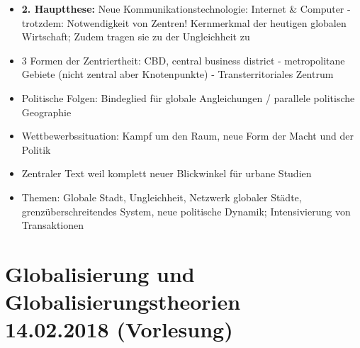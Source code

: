 \documentclass[emulatestandardclasses]{scrartcl}
\begin{document}
\begin{itemize}
  \item \textbf{2. Hauptthese:} Neue Kommunikationstechnologie: Internet \& Computer - trotzdem: Notwendigkeit von Zentren! Kernmerkmal der heutigen globalen Wirtschaft; Zudem tragen sie zu der Ungleichheit zu
  \item 3 Formen der Zentriertheit: CBD, central business district - metropolitane Gebiete (nicht zentral aber Knotenpunkte) - Transterritoriales Zentrum 
  \item Politische Folgen: Bindeglied für globale Angleichungen / parallele politische Geographie
  \item Wettbewerbssituation: Kampf um den Raum, neue Form der Macht und der Politik 
  \item Zentraler Text weil komplett neuer Blickwinkel für urbane Studien
  \item Themen: Globale Stadt, Ungleichheit, Netzwerk globaler Städte, grenzüberschreitendes System, neue politische Dynamik; Intensivierung von Transaktionen
\end{itemize}


\section{Globalisierung und Globalisierungstheorien\\14.02.2018 (Vorlesung)}
\end{document}
